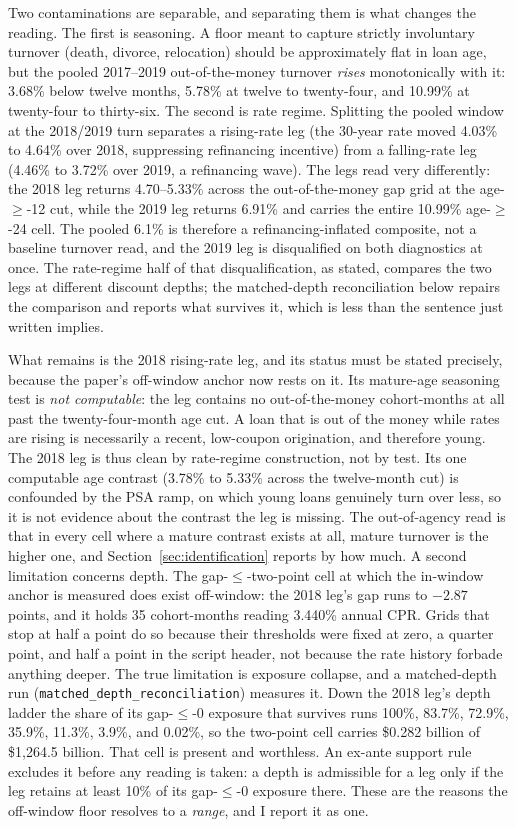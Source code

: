 \documentclass[12pt]{article}
\begin{document}
Two contaminations are separable, and separating them is what changes the reading. The first is seasoning. A floor meant to capture strictly involuntary turnover (death, divorce, relocation) should be approximately flat in loan age, but the pooled 2017--2019 out-of-the-money turnover \emph{rises} monotonically with it: 3.68\% below twelve months, 5.78\% at twelve to twenty-four, and 10.99\% at twenty-four to thirty-six. The second is rate regime. Splitting the pooled window at the 2018/2019 turn separates a rising-rate leg (the 30-year rate moved 4.03\% to 4.64\% over 2018, suppressing refinancing incentive) from a falling-rate leg (4.46\% to 3.72\% over 2019, a refinancing wave). The legs read very differently: the 2018 leg returns 4.70--5.33\% across the out-of-the-money gap grid at the age-$\geq$-12 cut, while the 2019 leg returns 6.91\% and carries the entire 10.99\% age-$\geq$-24 cell. The pooled 6.1\% is therefore a refinancing-inflated composite, not a baseline turnover read, and the 2019 leg is disqualified on both diagnostics at once. The rate-regime half of that disqualification, as stated, compares the two legs at different discount depths; the matched-depth reconciliation below repairs the comparison and reports what survives it, which is less than the sentence just written implies.

What remains is the 2018 rising-rate leg, and its status must be stated precisely, because the paper's off-window anchor now rests on it. Its mature-age seasoning test is \emph{not computable}: the leg contains no out-of-the-money cohort-months at all past the twenty-four-month age cut. A loan that is out of the money while rates are rising is necessarily a recent, low-coupon origination, and therefore young. The 2018 leg is thus clean by rate-regime construction, not by test. Its one computable age contrast (3.78\% to 5.33\% across the twelve-month cut) is confounded by the PSA ramp, on which young loans genuinely turn over less, so it is not evidence about the contrast the leg is missing. The out-of-agency read is that in every cell where a mature contrast exists at all, mature turnover is the higher one, and Section~\ref{sec:identification} reports by how much. A second limitation concerns depth. The gap-$\leq$-two-point cell at which the in-window anchor is measured does exist off-window: the 2018 leg's gap runs to $-2.87$ points, and it holds 35 cohort-months reading 3.440\% annual CPR. Grids that stop at half a point do so because their thresholds were fixed at zero, a quarter point, and half a point in the script header, not because the rate history forbade anything deeper. The true limitation is exposure collapse, and a matched-depth run (\texttt{matched\_depth\_reconciliation}) measures it. Down the 2018 leg's depth ladder the share of its gap-$\leq$-0 exposure that survives runs 100\%, 83.7\%, 72.9\%, 35.9\%, 11.3\%, 3.9\%, and 0.02\%, so the two-point cell carries \$0.282 billion of \$1{,}264.5 billion. That cell is present and worthless. An ex-ante support rule excludes it before any reading is taken: a depth is admissible for a leg only if the leg retains at least 10\% of its gap-$\leq$-0 exposure there. These are the reasons the off-window floor resolves to a \emph{range}, and I report it as one.
\end{document}
